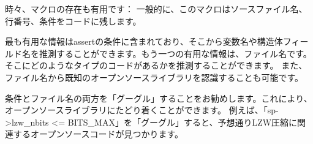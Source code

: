 
時々、マクロの存在も有用です：
一般的に、このマクロはソースファイル名、行番号、条件をコードに残します。

最も有用な情報はassertの条件に含まれており、そこから変数名や構造体フィールド名を推測することができます。もう一つの有用な情報は、ファイル名です。そこにどのようなタイプのコードがあるかを推測することができます。
また、ファイル名から既知のオープンソースライブラリを認識することも可能です。



条件とファイル名の両方を「グーグル」することをお勧めします。これにより、オープンソースライブラリにたどり着くことができます。
例えば、「sp->lzw\_nbits <= BITS\_MAX」を「グーグル」すると、予想通りLZW圧縮に関連するオープンソースコードが見つかります。